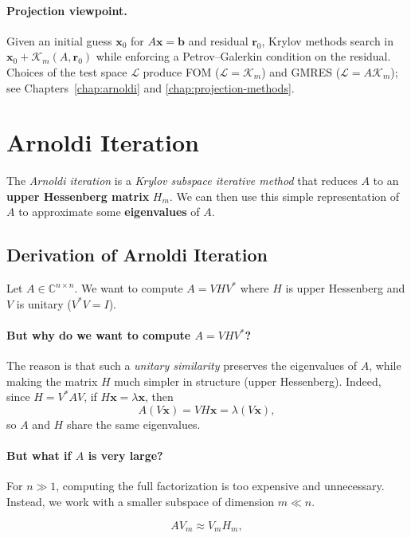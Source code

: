 \documentclass[../../main.tex]{subfiles}
\begin{document}
\paragraph{Projection viewpoint.} Given an initial guess $\mathbf{x}_0$ for $A\mathbf{x}=\mathbf{b}$ and residual $\mathbf{r}_0$, Krylov methods search in $\mathbf{x}_0+\mathcal{K}_m(A,\mathbf{r}_0)$ while enforcing a Petrov--Galerkin condition on the residual. Choices of the test space $\mathcal{L}$ produce FOM ($\mathcal{L}=\mathcal{K}_m$) and GMRES ($\mathcal{L}=A\mathcal{K}_m$); see Chapters~\ref{chap:arnoldi} and \ref{chap:projection-methods}.

\section{Arnoldi Iteration}
\label{sec:arnoldi-iteration}
The \emph{Arnoldi iteration} is a \emph{Krylov subspace iterative method} that reduces $A$ to an \textbf{upper Hessenberg matrix} $H_m$.
We can then use this simple representation of $A$ to approximate some \textbf{eigenvalues} of $A$.

\subsection{Derivation of Arnoldi Iteration}
Let $A \in \mathbb{C}^{n \times n}$.
We want to compute $A = V H V^\ast$ where $H$ is upper Hessenberg and $V$ is unitary ($V^\ast V = I$).

\paragraph{But why do we want to compute $A = V H V^\ast$?}
The reason is that such a \emph{unitary similarity} preserves the eigenvalues of $A$, while making the matrix $H$ much simpler in structure (upper Hessenberg).
Indeed, since $H = V^\ast A V$, if $H\mathbf{x} = \lambda \mathbf{x}$, then
\[
  A(V\mathbf{x}) = V H \mathbf{x} = \lambda (V\mathbf{x}),
\]
so $A$ and $H$ share the same eigenvalues.

\paragraph{But what if $A$ is very large?}
For $n \gg 1$, computing the full factorization is too expensive and unnecessary.
Instead, we work with a smaller subspace of dimension $m \ll n$.

\[
  A V_m \approx V_m H_m,
\]
\end{document}
